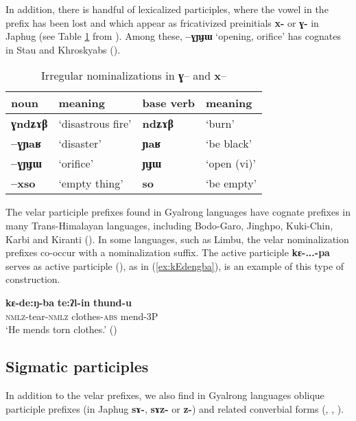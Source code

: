 \documentclass[oneside,a4paper,11pt]{article}
\newcommand{\ipa}[1]{\textbf{{\phon\mbox{#1}}}} %
\begin{document}
In addition, there is handful of lexicalized participles, where the vowel in the prefix has been lost and which appear as fricativized preinitials \ipa{x-} or \ipa{ɣ-} in Japhug (see Table \ref{tab:irr.nmlz}  from \citealt[5]{jacques14antipassive}). Among these, \ipa{--ɣɲɟɯ} `opening, orifice'  has cognates in Stau and Khroskyabs (\citealt[609]{jacques17stau}).

\begin{table}[H]
\caption{Irregular nominalizations in \ipa{ɣ}-- and \ipa{x}--} \label{tab:irr.nmlz} \centering
\begin{tabular}{llll}
\toprule
 noun & meaning &base verb & meaning\\
\midrule
\ipa{\textbf{ɣ}ndʑɤβ} & `disastrous fire' & \ipa{ndʑɤβ} & `burn' \\
\ipa{--\textbf{ɣ}ɲaʁ}   &`disaster'& \ipa{ɲaʁ} & `be black' \\
\ipa{--\textbf{ɣ}ɲɟɯ}   & `orifice' & \ipa{ɲɟɯ} &  `open (vi)' \\
\ipa{--\textbf{x}so}   &  `empty thing' &\ipa{so} & `be empty' \\
\bottomrule
\end{tabular}
\end{table}


The velar participle prefixes found in Gyalrong languages have cognate prefixes in many Trans-Himalayan languages, including Bodo-Garo, Jinghpo, Kuki-Chin, Karbi and Kiranti (\citealt{konnerth16gV, delancey15adjectival}).   In some languages, such as Limbu, the velar nominalization prefixes co-occur with a nominalization suffix. The active participle \ipa{kɛ-...-pa} serves as active participle (\citealt[199-202]{driem87}), as in (\ref{ex:kEdengba}), is an example of this type of construction.

\begin{exe}
\ex \label{ex:kEdengba}
 \gll \ipa{kɛ-de:ŋ-ba} \ipa{te:ʔl-in} \ipa{thund-u} \\
 \textsc{nmlz}-tear-\textsc{nmlz} clothes-\textsc{abs} mend-3P \\
 \glt `He mends torn clothes.' (\citealt[201]{driem87})
\end{exe}

\subsection{Sigmatic participles} \label{sec:rgyalrong.sigmatic}
In addition to the velar prefixes, we also find in Gyalrong languages oblique participle prefixes (in Japhug \ipa{sɤ-}, \ipa{sɤz-} or \ipa{z-}) and related converbial forms (\citet{yanmuchu05sa}, \citealt{jackson14morpho}, \citealt{jacques16relatives}).
\end{document}
